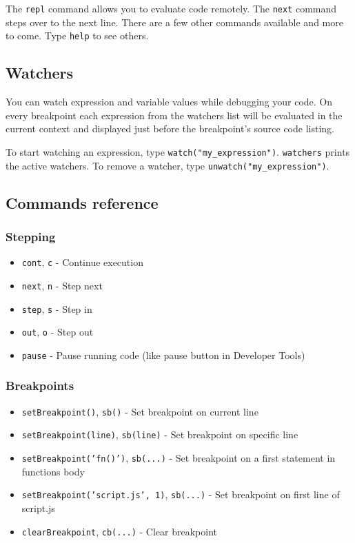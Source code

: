 The \texttt{repl} command allows you to evaluate code remotely. The
\texttt{next} command steps over to the next line. There are a few other
commands available and more to come. Type \texttt{help} to see others.

\subsection{Watchers}\label{watchers}

You can watch expression and variable values while debugging your code.
On every breakpoint each expression from the watchers list will be
evaluated in the current context and displayed just before the
breakpoint's source code listing.

To start watching an expression, type \texttt{watch("my\_expression")}.
\texttt{watchers} prints the active watchers. To remove a watcher, type
\texttt{unwatch("my\_expression")}.

\subsection{Commands reference}\label{commands-reference}

\subsubsection{Stepping}\label{stepping}

\begin{itemize}
\itemsep1pt\parskip0pt
\item
  \texttt{cont}, \texttt{c} - Continue execution
\item
  \texttt{next}, \texttt{n} - Step next
\item
  \texttt{step}, \texttt{s} - Step in
\item
  \texttt{out}, \texttt{o} - Step out
\item
  \texttt{pause} - Pause running code (like pause button in Developer
  Tools)
\end{itemize}

\subsubsection{Breakpoints}\label{breakpoints}

\begin{itemize}
\itemsep1pt\parskip0pt
\item
  \texttt{setBreakpoint()}, \texttt{sb()} - Set breakpoint on current
  line
\item
  \texttt{setBreakpoint(line)}, \texttt{sb(line)} - Set breakpoint on
  specific line
\item
  \texttt{setBreakpoint('fn()')}, \texttt{sb(...)} - Set breakpoint on a
  first statement in functions body
\item
  \texttt{setBreakpoint('script.js', 1)}, \texttt{sb(...)} - Set
  breakpoint on first line of script.js
\item
  \texttt{clearBreakpoint}, \texttt{cb(...)} - Clear breakpoint
\end{itemize}


